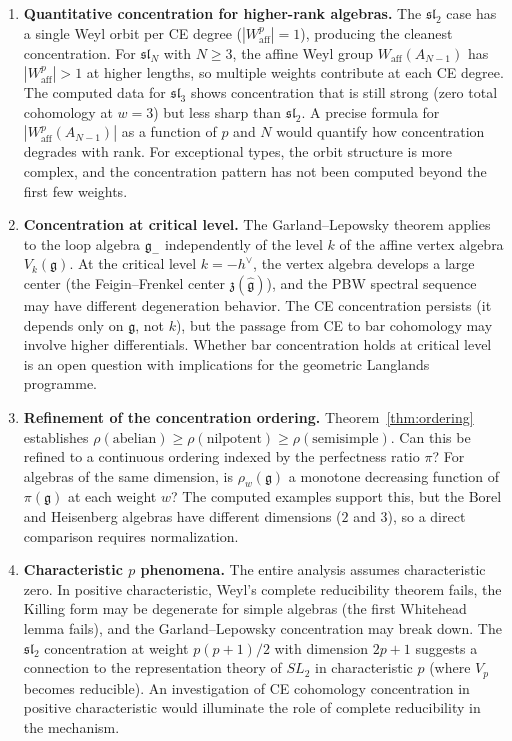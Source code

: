 \documentclass[11pt,reqno]{amsart}
\theoremstyle{plain}
\theoremstyle{definition}
\theoremstyle{remark}
\newcommand{\fg}{\mathfrak{g}}
\newcommand{\Waff}{W_{\mathrm{aff}}}
\newcommand{\gminus}{\fg_{-}}
\begin{document}
\begin{enumerate}[label=(\arabic*),leftmargin=*]

 \item \textbf{Quantitative concentration for higher-rank algebras.}
 The $\mathfrak{sl}_2$ case has a single Weyl orbit per CE degree
 ($|\Waff^p| = 1$), producing the cleanest concentration. For
 $\mathfrak{sl}_N$ with $N \ge 3$, the affine Weyl group $\Waff(A_{N-1})$
 has $|\Waff^p| > 1$ at higher lengths, so multiple weights contribute at
 each CE degree. The computed data for $\mathfrak{sl}_3$ shows
 concentration that is still strong (zero total cohomology at $w = 3$) but
 less sharp than $\mathfrak{sl}_2$. A precise formula for
 $|\Waff^p(A_{N-1})|$ as a function of $p$ and $N$ would quantify how
 concentration degrades with rank. For exceptional types, the orbit
 structure is more complex, and the concentration pattern has not been
 computed beyond the first few weights.

 \item \textbf{Concentration at critical level.}
 The Garland--Lepowsky theorem applies to the loop algebra $\gminus$
 independently of the level $k$ of the affine vertex algebra $V_k(\fg)$.
 At the critical level $k = -h^\vee$, the vertex algebra develops a large
 center (the Feigin--Frenkel center $\mathfrak{z}(\hat{\fg})$), and the PBW
 spectral sequence may have different degeneration behavior. The CE
 concentration persists (it depends only on $\fg$, not $k$), but the
 passage from CE to bar cohomology may involve higher differentials.
 Whether bar concentration holds at critical level is an open question
 with implications for the geometric Langlands programme.

 \item \textbf{Refinement of the concentration ordering.}
 Theorem~\ref{thm:ordering} establishes $\rho(\text{abelian}) \ge
 \rho(\text{nilpotent}) \ge \rho(\text{semisimple})$. Can this be
 refined to a continuous ordering indexed by the perfectness ratio $\pi$?
 For algebras of the same dimension, is $\rho_w(\fg)$ a monotone
 decreasing function of $\pi(\fg)$ at each weight $w$? The computed
 examples support this, but the Borel and Heisenberg algebras have
 different dimensions ($2$ and $3$), so a direct comparison requires
 normalization.

 \item \textbf{Characteristic $p$ phenomena.}
 The entire analysis assumes characteristic zero. In positive
 characteristic, Weyl's complete reducibility theorem fails, the Killing
 form may be degenerate for simple algebras (the first Whitehead lemma
 fails), and the Garland--Lepowsky concentration may break down. The
 $\mathfrak{sl}_2$ concentration at weight $p(p+1)/2$ with dimension
 $2p+1$ suggests a connection to the representation theory of $SL_2$
 in characteristic $p$ (where $V_p$ becomes reducible). An investigation
 of CE cohomology concentration in positive characteristic would
 illuminate the role of complete reducibility in the mechanism.


\end{enumerate}
\end{document}
